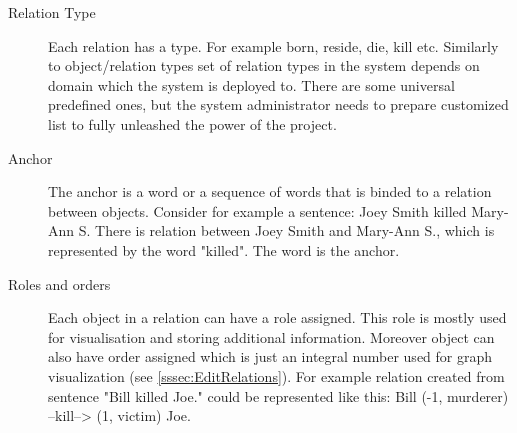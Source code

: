 \begin{description}
\item[Relation Type]
Each relation has a type. For example born, reside, die, kill etc. Similarly to
object/relation types set of relation types in the system depends on domain
which the system is deployed to. There are some universal predefined ones, but
the system administrator needs to prepare customized list to fully unleashed the
power of the project.

\item[Anchor]
The anchor is a word or a sequence of words that is binded to a relation between
objects. Consider for example a sentence: Joey Smith killed Mary-Ann S. There is
relation between Joey Smith and Mary-Ann S., which is represented by the word
"killed". The word is the anchor.

\item[Roles and orders]
Each object in a relation can have a role assigned. This role is mostly used
for visualisation and storing additional information. Moreover object can also
have order assigned which is just an integral number used for graph
visualization (see \ref{sssec:EditRelations}). For example relation created from
sentence "Bill killed Joe." could be represented like this:
Bill (-1, murderer) --kill--> (1, victim) Joe.
\end{description}

